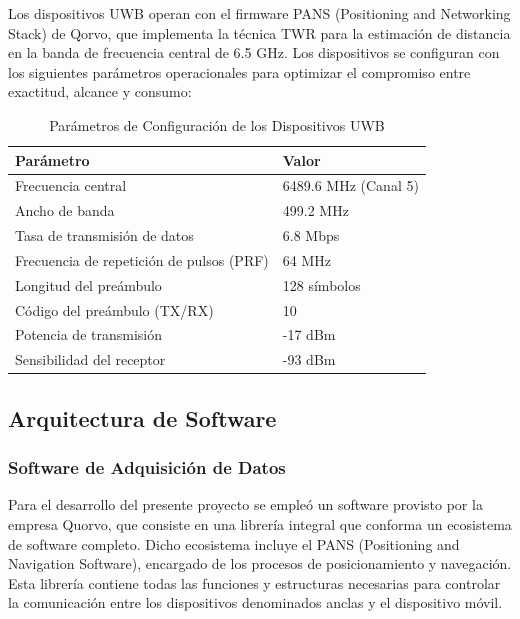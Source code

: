 Los dispositivos UWB operan con el firmware PANS (Positioning and Networking Stack) de Qorvo, que implementa la técnica TWR para la estimación de distancia en la banda de frecuencia central de 6.5 GHz. Los dispositivos se configuran con los siguientes parámetros operacionales para optimizar el compromiso entre exactitud, alcance y consumo:
%
\begin{table}[t]
    \centering
    \caption{Parámetros de Configuración de los Dispositivos UWB}
    \label{tab:configuracion_uwb}
    \begin{tabular}{ll}
        \toprule
        \rowcolor{headerblue}
        \textbf{Parámetro} & \textbf{Valor} \\
        \midrule
        Frecuencia central                     & 6489.6 MHz (Canal 5) \\
        Ancho de banda                         & 499.2 MHz            \\
        Tasa de transmisión de datos           & 6.8 Mbps             \\
        Frecuencia de repetición de pulsos (PRF) & 64 MHz               \\
        Longitud del preámbulo                 & 128 símbolos         \\
        Código del preámbulo (TX/RX)           & 10                   \\
        Potencia de transmisión                & -17 dBm              \\
        Sensibilidad del receptor              & -93 dBm              \\
        \bottomrule
    \end{tabular}
\end{table}

\subsection{Arquitectura de Software}
\label{subsec:arquitectura_software}

\subsubsection{Software de Adquisición de Datos}

Para el desarrollo del presente proyecto se empleó un software provisto por la empresa Quorvo, que consiste en una librería integral que conforma un ecosistema de software completo. Dicho ecosistema incluye el PANS (Positioning and Navigation Software), encargado de los procesos de posicionamiento y navegación. Esta librería contiene todas las funciones y estructuras necesarias para controlar la comunicación entre los dispositivos denominados anclas y el dispositivo móvil.

